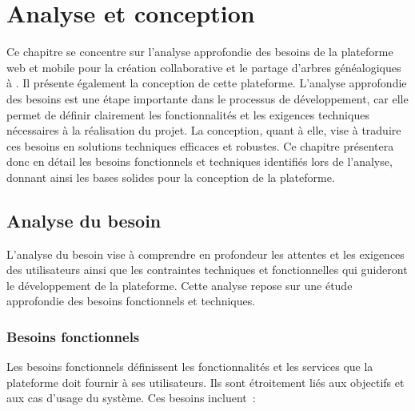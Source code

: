 \chapter{Analyse et conception}
Ce chapitre se concentre sur l’analyse approfondie des besoins de la plateforme
web et mobile pour la création collaborative et le partage d’arbres généalogiques
à \firm. Il présente également la conception de cette plateforme. L’analyse
approfondie des besoins est une étape importante dans le processus de développement,
car elle permet de définir clairement les fonctionnalités et les exigences
techniques nécessaires à la réalisation du projet. La conception, quant à elle,
vise à traduire ces besoins en solutions techniques efficaces et robustes.
Ce chapitre présentera donc en détail les besoins fonctionnels et techniques
identifiés lors de l’analyse, donnant ainsi les bases solides pour la conception de la plateforme.


\section{Analyse du besoin}
L'analyse du besoin vise à comprendre en profondeur les attentes et les exigences
des utilisateurs ainsi que les contraintes techniques et fonctionnelles qui
guideront le développement de la plateforme. Cette analyse repose sur une
étude approfondie des besoins fonctionnels et techniques.

\subsection{Besoins fonctionnels}
Les besoins fonctionnels définissent les fonctionnalités et les services que la
plateforme doit fournir à ses utilisateurs. Ils sont étroitement liés aux
objectifs et aux cas d’usage du système. Ces besoins incluent :

